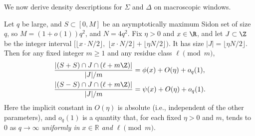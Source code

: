 \documentclass[11pt]{amsart}
\begin{document}
We now derive density descriptions for $\Sigma$ and $\Delta$ on macroscopic windows.
\begin{lemma}\label{lem:sum-diff-density}
  Let $q$ be large, and $S \subset [0,M]$ be an asymptotically maximum Sidon set of size $q$, so $M = (1 + o(1))q^2$, and $N = 4q^2$. Fix $\eta > 0$ and $x \in \R$, and let $J\subset\Z$ be the integer interval $[\lfloor x \cdot N/2 \rfloor,\;\lfloor x \cdot N/2 \rfloor+\lfloor \eta N/2 \rfloor)$. It has size $|J| = \lfloor \eta N/2 \rfloor$. Then for any fixed integer $m \geq 1$ and any residue class $\ell \pmod{m}$,
  \[
   \begin{aligned}
      \frac{|(S + S) \cap J \cap (\ell + m\Z)|}{|J|/m} &= \phi(x) + O(\eta) + o_q(1), \\
      \frac{|(S-S) \cap J \cap (\ell + m\Z)|}{|J|/m} &= \psi(x) + O(\eta) + o_q(1).
   \end{aligned}
  \]
  Here the implicit constant in $O(\eta)$ is absolute (i.e., independent of the other parameters), and $o_q(1)$ is a quantity that, for each fixed $\eta > 0$ and $m$, tends to $0$ as $q \to \infty$ \emph{uniformly in $x \in \mathbb R$ and $\ell \pmod m$}.
\end{lemma}
\end{document}
